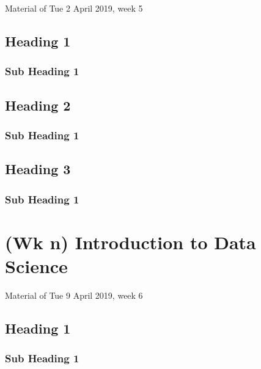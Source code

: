 \documentclass[]{book}
\begin{document}
Material of Tue 2 April 2019, week 5

\hypertarget{heading-1-3}{%
\section{Heading 1}\label{heading-1-3}}

\hypertarget{sub-heading-1-9}{%
\subsection{Sub Heading 1}\label{sub-heading-1-9}}

\hypertarget{heading-2-3}{%
\section{Heading 2}\label{heading-2-3}}

\hypertarget{sub-heading-1-10}{%
\subsection{Sub Heading 1}\label{sub-heading-1-10}}

\hypertarget{heading-3-3}{%
\section{Heading 3}\label{heading-3-3}}

\hypertarget{sub-heading-1-11}{%
\subsection{Sub Heading 1}\label{sub-heading-1-11}}

\hypertarget{wk-n-introduction-to-data-science}{%
\chapter{(Wk n) Introduction to Data Science}\label{wk-n-introduction-to-data-science}}

Material of Tue 9 April 2019, week 6

\hypertarget{heading-1-4}{%
\section{Heading 1}\label{heading-1-4}}

\hypertarget{sub-heading-1-12}{%
\subsection{Sub Heading 1}\label{sub-heading-1-12}}
\end{document}
